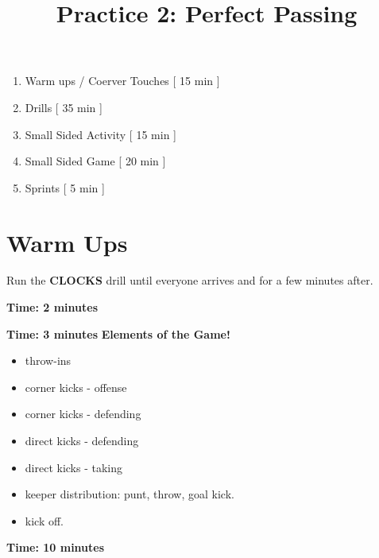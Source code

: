 \documentclass[10pt,letterpaper]{article}
\title{\vspace{-.5in}Practice 2: Perfect Passing}
\author{\vspace{-.5in}}
\date{\vspace{-.5in}}
\newenvironment{agendablock}[1]{%
    \tcolorbox[beamer,%
    noparskip,breakable,
    colback=LightGray,colframe=Black,%
    colbacklower=Gray!75!LightGray,%
    title=#1]}%
    {\endtcolorbox}
\newenvironment{myalertblock}[1]{%
    \tcolorbox[beamer,%
    noparskip,breakable,
    colback=LightCoral,colframe=DarkRed,%
    colbacklower=Tomato!75!LightCoral,%
    title=#1]}%
    {\endtcolorbox}
\begin{document}
\selectfont


\maketitle

\begin{agendablock}{Practice Activities}
    \begin{enumerate}
        \item Warm ups / Coerver Touches [ 15 min ]
        \item Drills [ 35 min ]
        \item Small Sided Activity [ 15 min ]
        \item Small Sided Game [ 20 min ]
        \item Sprints [ 5 min ] 
    \end{enumerate}
\end{agendablock}

\section{Warm Ups}
Run the \textbf{CLOCKS} drill until everyone arrives and for a few minutes after.

\textbf{Time: 2 minutes}


\textbf{Time: 3 minutes}
\begin{myalertblock}{Theme of the Practice}
    \textbf{Elements of the Game!}

    \begin{itemize}
        \setlength{\itemsep}{0pt}
        \setlength{\parskip}{0pt}
        \setlength{\parsep}{0pt}
        \item throw-ins
        \item corner kicks - offense
        \item corner kicks - defending
        \item direct kicks - defending
        \item direct kicks - taking
        \item keeper distribution: punt, throw, goal kick.
        \item kick off.
    \end{itemize}
\end{myalertblock}

\textbf{Time: 10 minutes}


\clearpage
\end{document}
